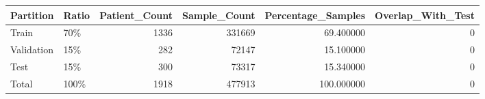 \begin{tabular}{llrrrr}
\toprule
Partition & Ratio & Patient\_Count & Sample\_Count & Percentage\_Samples & Overlap\_With\_Test \\
\midrule
Train & 70\% & 1336 & 331669 & 69.400000 & 0 \\
Validation & 15\% & 282 & 72147 & 15.100000 & 0 \\
Test & 15\% & 300 & 73317 & 15.340000 & 0 \\
Total & 100\% & 1918 & 477913 & 100.000000 & 0 \\
\bottomrule
\end{tabular}
